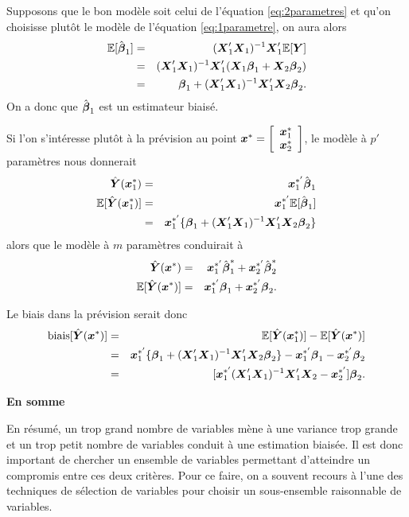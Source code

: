Supposons que le bon modèle soit celui de l'équation \eqref{eq:2parametres} et qu'on choisisse plutôt le modèle de l'équation \eqref{eq:1parametre}, on aura alors
\begin{eqnarray*}
  \esp[\hbobeta_1] &=& (\boX_1'\boX_1)^{-1}\boX_1'\esp[\boY] \\
  &=&  (\boX_1'\boX_1)^{-1}\boX_1' (\boX_1\bobeta_1 + \boX_2\bobeta_2)\\
  &=& \bobeta_1 + (\boX_1'\boX_1)^{-1}\boX_1'\boX_2 \bobeta_2.
\end{eqnarray*}
On a donc que $\hbobeta_1$ est un estimateur biaisé.

Si l'on s'intéresse plutôt à la prévision au point $\bo{x}^* = \left[\begin{array}{cc}\bo{x}_1^*\\\bo{x}_2^*\end{array}\right]$, le modèle à $p'$ paramètres nous donnerait
\begin{eqnarray*}
   \hY(\bo{x}_1^{*}) &=& \bo{x}_{1}^{*'} \hbobeta_1 \\
  \esp[\hY(\bo{x}_1^{*})] &=& \bo{x}_{1}^{*'} \esp[\hbobeta_1]  \\
     &=& \bo{x}_{1}^{*'} \{\bobeta_1 + (\boX_1'\boX_1)^{-1}\boX_1'\boX_2 \bobeta_2\}
\end{eqnarray*}
alors que le modèle à $m$ paramètres conduirait à
\begin{eqnarray*}
   \hY(\bo{x}^{*}) &=& \bo{x}_{1}^{*'} \hbobeta_1^* + \bo{x}_{2}^{*'}\hbobeta_2^* \\
  \esp[\hY(\bo{x}^{*})] &=&  \bo{x}_{1}^{*'} \bobeta_1 + \bo{x}_{2}^{*'}\bobeta_2.
\end{eqnarray*}

Le biais dans la prévision serait donc
\begin{eqnarray*}
   \mbox{biais}[\hY(\bo{x}^{*})]&=&  \esp[\hY(\bo{x}_1^{*})] -\esp[\hY(\bo{x}^{*})]\\
   &=& \bo{x}_{1}^{*'} \{\bobeta_1 + (\boX_1'\boX_1)^{-1}\boX_1'\boX_2 \bobeta_2\} -  \bo{x}_{1}^{*'} \bobeta_1 - \bo{x}_{2}^{*'}\bobeta_2\\
   &=& [{\bo{x}_{1}^{*'}(\boX_1'\boX_1)^{-1}\boX_1'\boX_2}-\bo{x}_{2}^{*'}]\bobeta_2.
\end{eqnarray*}

\textbf{En somme}

En résumé, un trop grand nombre de variables mène à une variance trop grande et un trop petit nombre de variables conduit à une estimation biaisée. Il est donc important de chercher un ensemble de variables permettant d'atteindre un compromis entre ces deux critères. Pour ce faire, on a souvent recours à l'une des techniques de sélection de variables pour choisir un sous-ensemble raisonnable de variables.

